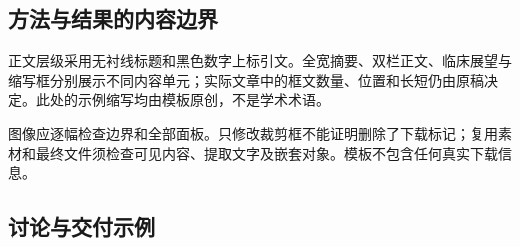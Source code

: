 \documentclass[UTF8,fontset=none,scheme=plain]{ctexart}
\begin{document}
\begin{ahacols}
\section*{方法与结果的内容边界}
正文层级采用无衬线标题和黑色数字上标引文。全宽摘要、双栏正文、临床展望与缩写框分别展示不同内容单元；实际文章中的框文数量、位置和长短仍由原稿决定。此处的示例缩写均由模板原创，不是学术术语。

图像应逐幅检查边界和全部面板。只修改裁剪框不能证明删除了下载标记；复用素材和最终文件须检查可见内容、提取文字及嵌套对象。模板不包含任何真实下载信息。
\end{ahacols}

\clearpage
\AhaFigure
\begin{ahacols}
\section*{讨论与交付示例}
\AhaBody
\AhaBackmatter
\end{ahacols}
\end{document}
